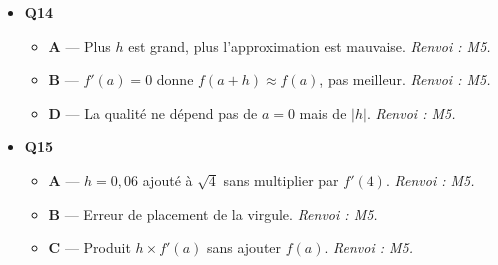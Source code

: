 \begin{itemize}
\begin{itemize}
  \end{itemize}
  \item \textbf{Q14}
  \begin{itemize}
    \item \textbf{A} — Plus $h$ est grand, plus l'approximation est mauvaise. \emph{Renvoi : M5.}
    \item \textbf{B} — $f'(a)=0$ donne $f(a+h) \approx f(a)$, pas meilleur. \emph{Renvoi : M5.}
    \item \textbf{D} — La qualité ne dépend pas de $a=0$ mais de $|h|$. \emph{Renvoi : M5.}
  \end{itemize}
  \item \textbf{Q15}
  \begin{itemize}
    \item \textbf{A} — $h=0{,}06$ ajouté à $\sqrt{4}$ sans multiplier par $f'(4)$. \emph{Renvoi : M5.}
    \item \textbf{B} — Erreur de placement de la virgule. \emph{Renvoi : M5.}
    \item \textbf{C} — Produit $h \times f'(a)$ sans ajouter $f(a)$. \emph{Renvoi : M5.}
  \end{itemize}
\end{itemize}
\fi
